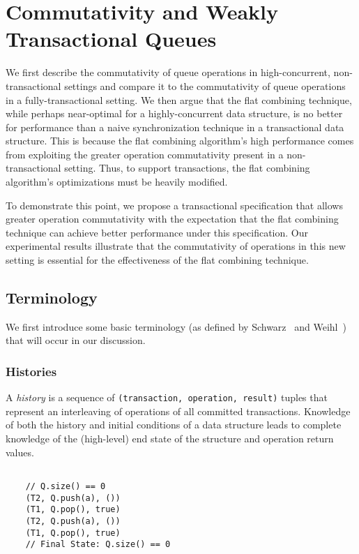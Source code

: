 \chapter{Commutativity and Weakly Transactional Queues}
\label{commutativity}

We first describe the commutativity of queue operations in high-concurrent, non-transactional settings and compare it to the commutativity of queue operations in a fully-transactional setting. We then argue that the flat combining technique, while perhaps near-optimal for a highly-concurrent data structure, is no better for performance than a naive synchronization technique in a transactional data structure. This is because the flat combining algorithm's high performance comes from exploiting the greater operation commutativity present in a non-transactional setting. Thus, to support transactions, the flat combining algorithm's optimizations must be heavily modified. 

To demonstrate this point, we propose a transactional specification that allows greater operation commutativity with the expectation that the flat combining technique can achieve better performance under this specification. Our experimental results illustrate that the commutativity of operations in this new setting is essential for the effectiveness of the flat combining technique.

\section{Terminology}
We first introduce some basic terminology (as defined by Schwarz~\cite{schwarz} and Weihl~\cite{weihl}) that will occur in our discussion.

\subsection{Histories}
\begin{defn}
    A \emph{history} is a sequence of \texttt{(transaction, operation, result)} tuples that represent an interleaving of operations of all committed transactions. Knowledge of both the history and initial conditions of a data structure leads to complete knowledge of the (high-level) end state of the structure and operation return values.

\begin{eg}
    \singlespacing   

    \begin{lstlisting}

    // Q.size() == 0 
    (T2, Q.push(a), ())
    (T1, Q.pop(), true)
    (T2, Q.push(a), ())
    (T1, Q.pop(), true)
    // Final State: Q.size() == 0 
    \end{lstlisting}
    \doublespacing
\end{eg}

\end{defn}

